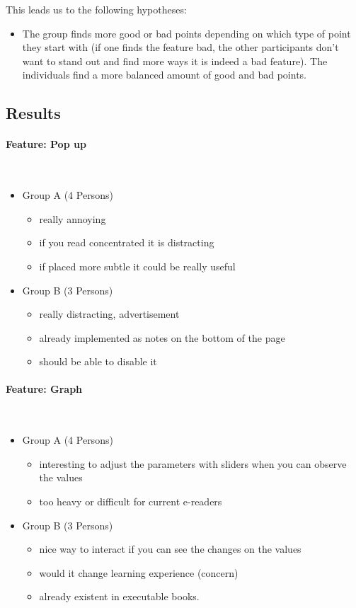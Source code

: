 \documentclass[main.tex]{subfiles}
\begin{document}
This leads us to the following hypotheses:
\begin{itemize}
\item The group finds more good or bad points depending on which type of point they start with (if one finds the feature bad, the other participants don't want to stand out and find more ways it is indeed a bad feature). The individuals find a more balanced amount of good and bad points.
\end{itemize}

\subsection{Results}
\paragraph{Feature: Pop up}~
\begin{itemize}
	\item Group A (4 Persons)
		\begin{itemize}
			\item really annoying
			\item if you read concentrated it is distracting
			\item  if placed more subtle it could be really useful
		\end{itemize}
	\item Group B (3 Persons)
		\begin{itemize}
			\item really distracting, advertisement
			\item already implemented as notes on the bottom of the page
			\item  should be able to disable it
		\end{itemize}
\end{itemize}

\paragraph{Feature: Graph}~
\begin{itemize}
	\item Group A (4 Persons)
		\begin{itemize}
			\item interesting to adjust the parameters with sliders when you can observe the values
			\item too heavy or difficult for current e-readers
		\end{itemize}
	\item Group B (3 Persons)
		\begin{itemize}
			\item nice way to interact if you can see the changes on the values
			\item would it change learning experience (concern)
			\item already existent in executable books.
		\end{itemize}
\end{itemize}
\end{document}
